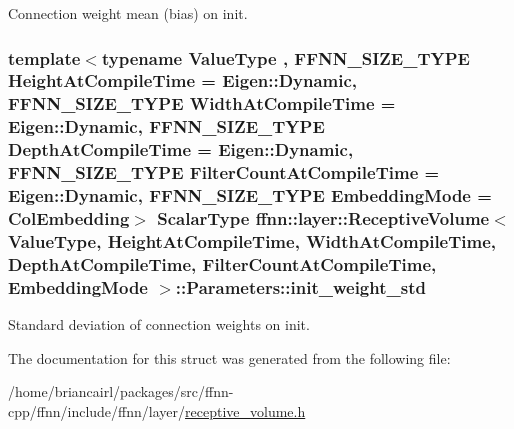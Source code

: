 Connection weight mean (bias) on init. 

\hypertarget{structffnn_1_1layer_1_1_receptive_volume_1_1_parameters_a70c92940ea42992f3ec993e699fb4910}{
\subsubsection[{init\-\_\-weight\-\_\-std}]{\setlength{\rightskip}{0pt plus 5cm}template$<$typename Value\-Type , F\-F\-N\-N\-\_\-\-S\-I\-Z\-E\-\_\-\-T\-Y\-P\-E Height\-At\-Compile\-Time = Eigen\-::\-Dynamic, F\-F\-N\-N\-\_\-\-S\-I\-Z\-E\-\_\-\-T\-Y\-P\-E Width\-At\-Compile\-Time = Eigen\-::\-Dynamic, F\-F\-N\-N\-\_\-\-S\-I\-Z\-E\-\_\-\-T\-Y\-P\-E Depth\-At\-Compile\-Time = Eigen\-::\-Dynamic, F\-F\-N\-N\-\_\-\-S\-I\-Z\-E\-\_\-\-T\-Y\-P\-E Filter\-Count\-At\-Compile\-Time = Eigen\-::\-Dynamic, F\-F\-N\-N\-\_\-\-S\-I\-Z\-E\-\_\-\-T\-Y\-P\-E Embedding\-Mode = Col\-Embedding$>$ {\bf Scalar\-Type} {\bf ffnn\-::layer\-::\-Receptive\-Volume}$<$ Value\-Type, Height\-At\-Compile\-Time, Width\-At\-Compile\-Time, Depth\-At\-Compile\-Time, Filter\-Count\-At\-Compile\-Time, {\bf Embedding\-Mode} $>$\-::Parameters\-::init\-\_\-weight\-\_\-std}}\label{structffnn_1_1layer_1_1_receptive_volume_1_1_parameters_a70c92940ea42992f3ec993e699fb4910}


Standard deviation of connection weights on init. 



The documentation for this struct was generated from the following file\-:\begin{DoxyCompactItemize}
\item 
/home/briancairl/packages/src/ffnn-\/cpp/ffnn/include/ffnn/layer/\hyperlink{receptive__volume_8h}{receptive\-\_\-volume.\-h}\end{DoxyCompactItemize}
